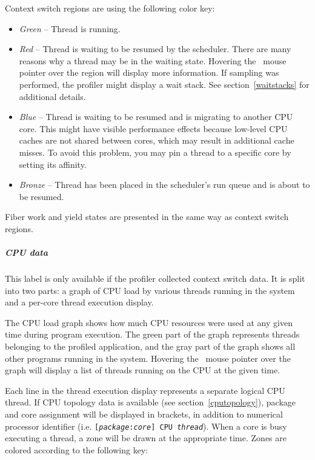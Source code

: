 \documentclass[hidelinks,titlepage,a4paper,twoside]{article}
\begin{document}
Context switch regions are using the following color key:

\begin{itemize}
\item \emph{Green} -- Thread is running.
\item \emph{Red} -- Thread is waiting to be resumed by the scheduler. There are many reasons why a thread may be in the waiting state. Hovering the \faArrowPointer{}~mouse pointer over the region will display more information. If sampling was performed, the profiler might display a wait stack. See section~\ref{waitstacks} for additional details.
\item \emph{Blue} -- Thread is waiting to be resumed and is migrating to another CPU core. This might have visible performance effects because low-level CPU caches are not shared between cores, which may result in additional cache misses. To avoid this problem, you may pin a thread to a specific core by setting its affinity.
\item \emph{Bronze} -- Thread has been placed in the scheduler's run queue and is about to be resumed.
\end{itemize}

Fiber work and yield states are presented in the same way as context switch regions.

\subparagraph{CPU data}

This label is only available if the profiler collected context switch data. It is split into two parts: a graph of CPU load by various threads running in the system and a per-core thread execution display.

The CPU load graph shows how much CPU resources were used at any given time during program execution. The green part of the graph represents threads belonging to the profiled application, and the gray part of the graph shows all other programs running in the system. Hovering the \faArrowPointer{}~mouse pointer over the graph will display a list of threads running on the CPU at the given time.

Each line in the thread execution display represents a separate logical CPU thread. If CPU topology data is available (see section~\ref{cputopology}), package and core assignment will be displayed in brackets, in addition to numerical processor identifier (i.e. \texttt{[\emph{package}:\emph{core}] CPU \emph{thread}}). When a core is busy executing a thread, a zone will be drawn at the appropriate time. Zones are colored according to the following key:
\end{document}
